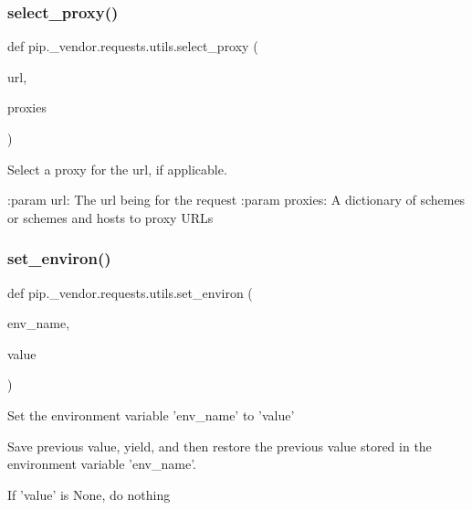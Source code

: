 \subsubsection{\texorpdfstring{select\+\_\+proxy()}{select\_proxy()}}
{\footnotesize\ttfamily def pip.\+\_\+vendor.\+requests.\+utils.\+select\+\_\+proxy (\begin{DoxyParamCaption}\item[{}]{url,  }\item[{}]{proxies }\end{DoxyParamCaption})}

\begin{DoxyVerb}Select a proxy for the url, if applicable.

:param url: The url being for the request
:param proxies: A dictionary of schemes or schemes and hosts to proxy URLs
\end{DoxyVerb}
 \mbox{\label{namespacepip_1_1__vendor_1_1requests_1_1utils_a9684ad18e669b3368bcbb35ad6ce1c43}} 
\subsubsection{\texorpdfstring{set\+\_\+environ()}{set\_environ()}}
{\footnotesize\ttfamily def pip.\+\_\+vendor.\+requests.\+utils.\+set\+\_\+environ (\begin{DoxyParamCaption}\item[{}]{env\+\_\+name,  }\item[{}]{value }\end{DoxyParamCaption})}

\begin{DoxyVerb}Set the environment variable 'env_name' to 'value'

Save previous value, yield, and then restore the previous value stored in
the environment variable 'env_name'.

If 'value' is None, do nothing\end{DoxyVerb}
 \mbox{\label{namespacepip_1_1__vendor_1_1requests_1_1utils_a962119fb89cc1cee022c8898e5144378}} 
